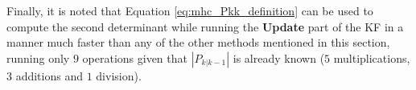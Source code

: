    
    

Finally, it is noted that Equation \eqref{eq:mhc_Pkk_definition} can be used to compute the second determinant while running the \textbf{Update} part of the KF in a manner much faster than any of the other methods mentioned in this section, running only $9$ operations given that $|P_{k|k-1}|$ is already known ($5$ multiplications, $3$ additions and $1$ division).


